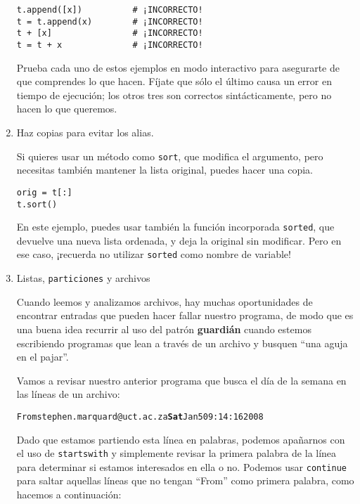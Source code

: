 \begin{enumerate}
\beforeverb
\begin{verbatim}
t.append([x])          # ¡INCORRECTO!
t = t.append(x)        # ¡INCORRECTO!
t + [x]                # ¡INCORRECTO!
t = t + x              # ¡INCORRECTO!
\end{verbatim}
\afterverb

Prueba cada uno de estos ejemplos en modo interactivo para asegurarte
de que comprendes lo que hacen. Fíjate que sólo el último
causa un error en tiempo de ejecución; los otros tres son correctos sintácticamente, pero
no hacen lo que queremos.


\item Haz copias para evitar los alias.


Si quieres usar un método como {\tt sort}, que modifica
el argumento, pero necesitas también mantener la lista original,
puedes hacer una copia.

\beforeverb
\begin{verbatim}
orig = t[:]
t.sort()
\end{verbatim}
\afterverb

En este ejemplo, puedes usar también la función incorporada {\tt sorted},
que devuelve una nueva lista ordenada, y deja la original sin modificar.
Pero en ese caso, ¡recuerda no utilizar {\tt sorted} como nombre de
variable!

\item Listas, {\tt particiones} y archivos

Cuando leemos y analizamos archivos, hay muchas oportunidades
de encontrar entradas que pueden hacer fallar nuestro programa, de modo que
es una buena idea recurrir al uso del patrón {\bf guardián} cuando
estemos escribiendo programas que lean a través de un archivo
y busquen ``una aguja en el pajar''.

Vamos a revisar nuestro anterior programa que busca el día de la semana
en las líneas de un archivo:

\beforeverb
\begin{alltt}
From stephen.marquard@uct.ac.za {\bf Sat} Jan  5 09:14:16 2008
\end{alltt}
\afterverb

Dado que estamos partiendo esta línea en palabras, podemos apañarnos
con el uso de {\tt startswith} y simplemente revisar la
primera palabra de la línea para determinar si estamos interesados
en ella o no. Podemos usar {\tt continue} para saltar aquellas
líneas que no tengan ``From'' como primera palabra, como hacemos
a continuación:


\end{enumerate}
